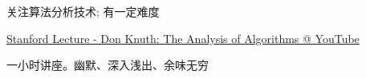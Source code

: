 \begin{frame}{}
  \begin{columns}
  \end{columns}

  \vspace{0.50cm}
  \begin{center}
    关注算法分析技术; 有一定难度
  \end{center}
\end{frame}

\begin{frame}{}

  \centerline{\href{https://youtu.be/jmcSzzN1gkc}{Stanford Lecture - Don Knuth: The Analysis of Algorithms @ YouTube}}

  \vspace{0.30cm}
  \centerline{一小时讲座。幽默、深入浅出、余味无穷}
\end{frame}
